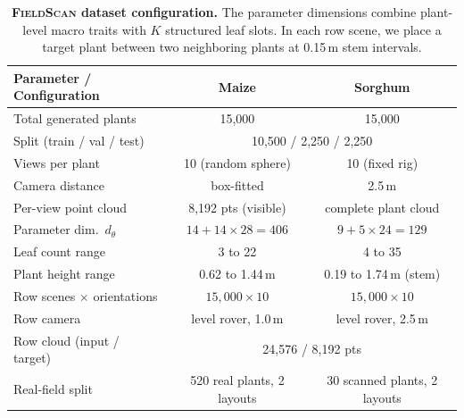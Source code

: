 \documentclass[10pt,twocolumn,letterpaper]{article}
\newcommand{\dataset}{\textsc{FieldScan}}
\begin{document}
\begin{table}[t]
  \caption{\textbf{\dataset{} dataset configuration.} The parameter dimensions combine plant-level macro traits with $K$ structured leaf slots. In each row scene, we place a target plant between two neighboring plants at 0.15\,m stem intervals.}
  \label{tab:fieldproc}
  \centering\scriptsize
  \setlength{\tabcolsep}{3pt}
  \begin{tabular}{lcc}
    \toprule
    Parameter / Configuration & Maize & Sorghum \\
    \midrule
    Total generated plants & 15{,}000 & 15{,}000 \\
    Split (train / val / test) & \multicolumn{2}{c}{10{,}500 / 2{,}250 / 2{,}250} \\
    Views per plant & 10 (random sphere) & 10 (fixed rig) \\
    Camera distance & box-fitted & 2.5\,m \\
    Per-view point cloud & 8{,}192 pts (visible) & complete plant cloud \\
    Parameter dim.\ $d_\theta$ & $14{+}14{\times}28{=}406$ & $9{+}5{\times}24{=}129$ \\
    Leaf count range & 3 to 22 & 4 to 35 \\
    Plant height range & 0.62 to 1.44\,m & 0.19 to 1.74\,m (stem) \\
    Row scenes $\times$ orientations & $15{,}000 \times 10$ & $15{,}000 \times 10$ \\
    Row camera & level rover, 1.0\,m & level rover, 2.5\,m \\
    Row cloud (input / target) & \multicolumn{2}{c}{24{,}576 / 8{,}192 pts} \\
    Real-field split & 520 real plants, 2 layouts & 30 scanned plants, 2 layouts \\
    \bottomrule
  \end{tabular}
\end{table}
\end{document}
